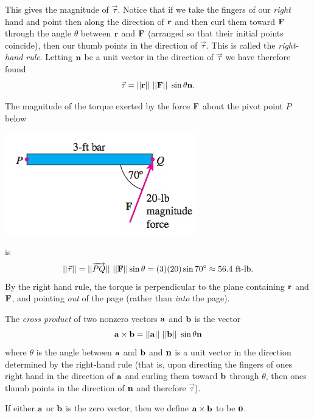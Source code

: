 \documentclass[12pt,letterpaper,reqno]{article}
\numberwithin{equation}{section}
\newcommand{\ti}[1]{\textit{#1}}
\begin{document}
This gives the magnitude of $\vec{\tau}$. Notice that if we take the fingers of our \ti{right} hand and point then along the direction of ${\bf r}$ and then curl them toward ${\bf F}$ through the angle $\theta$ between ${\bf r}$ and ${\bf F}$ (arranged so that their initial points coincide), then our thumb points in the direction of $\vec{\tau}$. This is called the \ti{right-hand rule}. Letting ${\bf n}$ be a unit vector in the direction of $\vec{\tau}$ we have therefore found
\begin{equation}
	\vec{\tau}=||{\bf r}|| \ ||{\bf F}|| \ \sin \theta{\bf n}.
\end{equation}

\begin{example}
The magnitude of the torque exerted by the force ${\bf F}$ about the pivot point $P$ below 

\begin{center}
	\includegraphics[scale=0.5]{figures_mvc/torque_example}
\end{center}

is 
\begin{align*}
	||\vec{\tau}||=||\overrightarrow{PQ}|| \ ||{\bf F}|| \sin \theta = (3)(20)\sin 70^\circ \approx 56.4 \text{ ft-lb}.
\end{align*}
By the right hand rule, the torque is perpendicular to the plane  containing ${\bf r}$ and ${\bf F}$, and pointing \ti{out} of the page (rather than \ti{into} the page).
\end{example}


\begin{defn}
The \ti{cross product} of two nonzero vectors ${\bf a}$ and ${\bf b}$ is the vector
\begin{equation}
	{\bf a} \times {\bf b}=||{\bf a}|| \ ||{\bf b}|| \ \sin \theta{\bf n}
\end{equation}
where $\theta$ is the angle between ${\bf a}$ and ${\bf b}$ and ${\bf n}$ is a unit vector in the direction determined by the right-hand rule (that is, upon directing the fingers of ones right hand in the direction of ${\bf a}$ and curling them toward ${\bf b}$ through $\theta$, then ones thumb points in the direction of ${\bf n}$ and therefore $\overrightarrow{\tau}$). 

If either ${\bf a}$ or ${\bf b}$ is the zero vector, then we define ${\bf a} \times {\bf b}$ to be ${\bf 0}$.
\end{defn}
\end{document}
